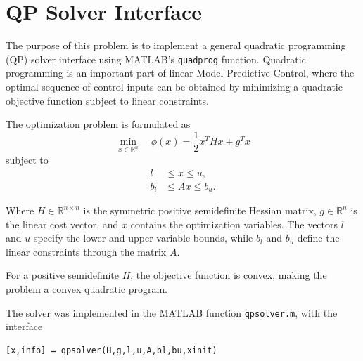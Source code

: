 \chapter{QP Solver Interface}
\label{chap:problem7}

The purpose of this problem is to implement a general quadratic programming (QP) solver interface using MATLAB's \texttt{quadprog} function. Quadratic programming is an important part of linear Model Predictive Control, where the optimal sequence of control inputs can be obtained by minimizing a quadratic objective function subject to linear constraints.

The optimization problem is formulated as
\begin{equation}
    \min_{x \in \mathbb{R}^n}
    \quad
    \phi(x) = \frac{1}{2}x^T Hx + g^T x
    \label{eq:qp_objective}
\end{equation}
subject to
\begin{align}
    l &\leq x \leq u, \\
    b_l &\leq Ax \leq b_u.
\end{align}

Where $H \in \mathbb{R}^{n \times n}$ is the symmetric positive semidefinite Hessian matrix, $g \in \mathbb{R}^n$ is the linear cost vector, and $x$ contains the optimization variables. The vectors $l$ and $u$ specify the lower and upper variable bounds, while $b_l$ and $b_u$ define the linear constraints through the matrix $A$.

For a positive semidefinite $H$, the objective function is convex, making the problem a convex quadratic program.

The solver was implemented in the MATLAB function
\texttt{qpsolver.m}, with the interface
\begin{verbatim}
[x,info] = qpsolver(H,g,l,u,A,bl,bu,xinit)
\end{verbatim}



